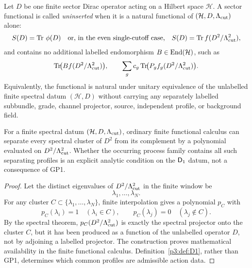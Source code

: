 \documentclass[12pt,a4paper]{article}
\begin{document}
\begin{definition}
\label{p3:def:uninserted-sector-functional}
Let \(D\) be one finite sector Dirac operator acting on a Hilbert space \(\mathcal H\).  A
sector functional is called \emph{uninserted} when it is a natural functional of
\((\mathcal H,D,\Lambda_{\mathrm{cut}})\) alone:
\[
        S(D)=\operatorname{Tr}\,\phi(D)
        \quad\text{or, in the even single-cutoff case,}\quad
        S(D)=\operatorname{Tr} f(D^2/\Lambda_{\mathrm{cut}}^2),
\]
and contains no additional labelled endomorphism \(B\in\operatorname{End}(\mathcal H)\), such as
\[
        \operatorname{Tr}\!\bigl(B f(D^2/\Lambda_{\mathrm{cut}}^2)\bigr),
        \qquad
        \sum_g c_g\operatorname{Tr}\!\bigl(P_g f_g(D^2/\Lambda_{\mathrm{cut}}^2)\bigr).
\]
Equivalently, the functional is natural under unitary equivalence of the unlabelled
finite spectral datum \((\mathcal H,D)\) without carrying any separately labelled
subbundle, grade, channel projector, source, independent profile, or background field.
\end{definition}


\begin{lemma}
\label{p3:lem:finite-window-spectral-separation}
For a finite spectral datum \((\mathcal H,D,\Lambda_{\mathrm{cut}})\), ordinary finite
functional calculus can separate every spectral cluster of \(D^2\) from its
complement by a polynomial evaluated on \(D^2/\Lambda_{\mathrm{cut}}^2\).  Whether the
occurring process family contains all such separating profiles is an explicit
analytic condition on the \(\mathsf{D}_1\) datum, not a consequence of GP1.
\end{lemma}

\begin{proof}
Let the distinct eigenvalues of \(D^2/\Lambda_{\mathrm{cut}}^2\) in the finite window be
\[
        \lambda_1,\ldots,\lambda_N .
\]
For any cluster \(C\subset\{\lambda_1,\ldots,\lambda_N\}\), finite interpolation gives a polynomial \(p_C\) with
\[
        p_C(\lambda_i)=1\quad(\lambda_i\in C),
        \qquad
        p_C(\lambda_j)=0\quad(\lambda_j\notin C).
\]
By the spectral theorem, \(p_C(D^2/\Lambda_{\mathrm{cut}}^2)\) is exactly the spectral
projector onto the cluster \(C\), but it has been produced as a function of
the unlabelled operator \(D\), not by adjoining a labelled projector.  The
construction proves mathematical availability in the finite functional
calculus.  Definition~\ref{p3:def:D1}, rather than GP1, determines which
common profiles are admissible action data.
\end{proof}
\end{document}
